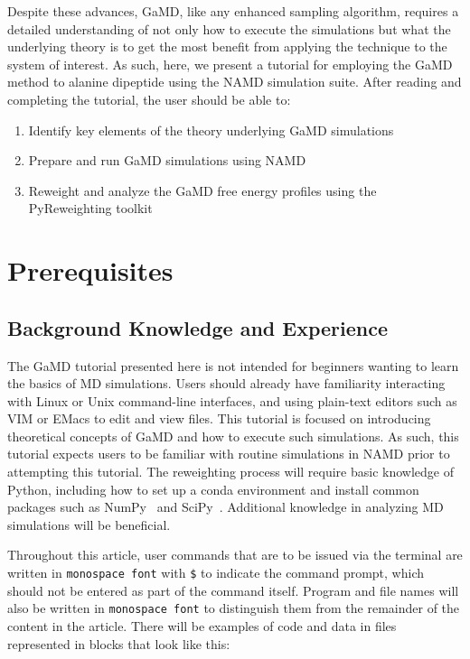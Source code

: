\documentclass[9pt,tutorial]{livecoms}
\begin{document}
Despite these advances, GaMD, like any enhanced sampling algorithm, requires a detailed understanding of not only how to execute the simulations but what the underlying theory is to get the most benefit from applying the technique to the system of interest. As such, here, we present a tutorial for employing the GaMD method to alanine dipeptide using the NAMD simulation suite. After reading and completing the tutorial, the user should be able to:
\begin{enumerate}
    \item Identify key elements of the theory underlying GaMD simulations
    \item Prepare and run GaMD simulations using NAMD
    \item Reweight and analyze the GaMD free energy profiles using the PyReweighting toolkit
\end{enumerate}

\section{Prerequisites}
\subsection{Background Knowledge and Experience}
The GaMD tutorial presented here is not intended for beginners wanting to learn the basics of MD simulations. Users should already have familiarity interacting with Linux or Unix command-line interfaces, and using plain-text editors such as VIM or EMacs to edit and view files. This tutorial is focused on introducing theoretical concepts of GaMD and how to execute such simulations. As such, this tutorial expects users to be familiar with routine simulations in NAMD prior to attempting this tutorial. The reweighting process will require basic knowledge of Python, including how to set up a conda environment and install common packages such as NumPy~\cite{numpy} and SciPy~\cite{scipy}. Additional knowledge in analyzing MD simulations will be beneficial.

Throughout this article, user commands that are to be issued via the terminal are written in \texttt{monospace font} with \texttt{\$} to indicate the command prompt, which should not be entered as part of the command itself. Program and file names will also be written in \texttt{monospace font} to distinguish them from the remainder of the content in the article. There will be examples of code and data in files represented in blocks that look like this:
\end{document}
